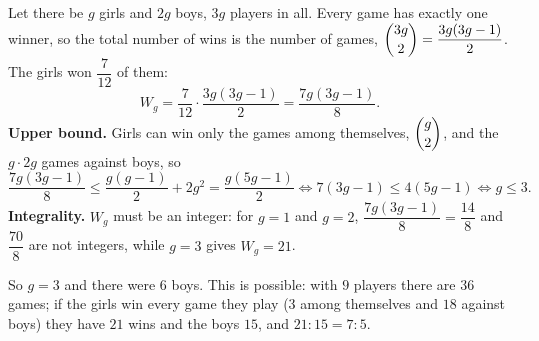 Let there be $g$ girls and $2g$ boys, $3g$ players in all. Every game has exactly one winner, so the total number of wins is the number of games, $\dbinom{3g}{2}=\dfrac{3g(3g-1)}{2}$. The girls won $\dfrac{7}{12}$ of them:
\[
W_g=\dfrac{7}{12}\cdot\dfrac{3g(3g-1)}{2}=\dfrac{7g(3g-1)}{8}.
\]
\textbf{Upper bound.} Girls can win only the games among themselves, $\dbinom g2$, and the $g\cdot2g$ games against boys, so
\[
\dfrac{7g(3g-1)}{8}\le\dfrac{g(g-1)}{2}+2g^2=\dfrac{g(5g-1)}{2}\iff 7(3g-1)\le4(5g-1)\iff g\le3 .
\]
\textbf{Integrality.} $W_g$ must be an integer: for $g=1$ and $g=2$, $\dfrac{7g(3g-1)}{8}=\dfrac{14}{8}$ and $\dfrac{70}{8}$ are not integers, while $g=3$ gives $W_g=21$.

So $g=3$ and there were $\boxed{6}$ boys. This is possible: with $9$ players there are $36$ games; if the girls win every game they play ($3$ among themselves and $18$ against boys) they have $21$ wins and the boys $15$, and $21:15=7:5$.
